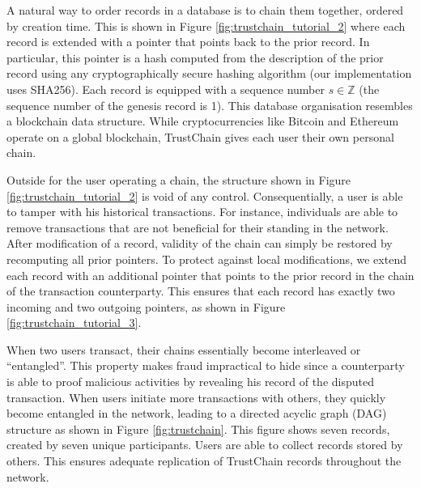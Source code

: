 A natural way to order records in a database is to chain them together, ordered by creation time.
This is shown in Figure \ref{fig:trustchain_tutorial_2} where each record is extended with a pointer that points back to the prior record.
In particular, this pointer is a hash computed from the description of the prior record using any cryptographically secure hashing algorithm (our implementation uses SHA256).
Each record is equipped with a sequence number $ s \in \mathbb{Z} $ (the sequence number of the genesis record is 1).
This database organisation resembles a blockchain data structure.
While cryptocurrencies like Bitcoin and Ethereum operate on a global blockchain, TrustChain gives each user their own personal chain.

Outside for the user operating a chain, the structure shown in Figure \ref{fig:trustchain_tutorial_2} is void of any control.
Consequentially, a user is able to tamper with his historical transactions.
For instance, individuals are able to remove transactions that are not beneficial for their standing in the network.
After modification of a record, validity of the chain can simply be restored by recomputing all prior pointers.
To protect against local modifications, we extend each record with an additional pointer that points to the prior record in the chain of the transaction counterparty.
This ensures that each record has exactly two incoming and two outgoing pointers, as shown in Figure \ref{fig:trustchain_tutorial_3}.

When two users transact, their chains essentially become interleaved or \enquote{entangled}.
This property makes fraud impractical to hide since a counterparty is able to proof malicious activities by revealing his record of the disputed transaction.
When users initiate more transactions with others, they quickly become entangled in the network, leading to a directed acyclic graph (DAG) structure as shown in Figure \ref{fig:trustchain}.
This figure shows seven records, created by seven unique participants.
Users are able to collect records stored by others.
This ensures adequate replication of TrustChain records throughout the network.

